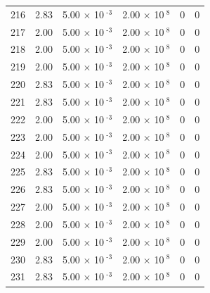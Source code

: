 \documentclass[a4paper,11pt]{article}
\begin{document}
\begin{center}
\begin{longtable}{|R{1.5cm}|R{2.4cm}|R{2.4cm}|R{2.4cm}|R{2.4cm}|R{2.4cm}|}
  216 &   2.83  &         5.00 $\times$ 10$^{\text{          -3}}$  &         2.00 $\times$ 10$^{\text{           8}}$  & 0  & 0 \\
  217 &   2.00  &         5.00 $\times$ 10$^{\text{          -3}}$  &         2.00 $\times$ 10$^{\text{           8}}$  & 0  & 0 \\
  218 &   2.00  &         5.00 $\times$ 10$^{\text{          -3}}$  &         2.00 $\times$ 10$^{\text{           8}}$  & 0  & 0 \\
  219 &   2.00  &         5.00 $\times$ 10$^{\text{          -3}}$  &         2.00 $\times$ 10$^{\text{           8}}$  & 0  & 0 \\
  220 &   2.83  &         5.00 $\times$ 10$^{\text{          -3}}$  &         2.00 $\times$ 10$^{\text{           8}}$  & 0  & 0 \\
  221 &   2.83  &         5.00 $\times$ 10$^{\text{          -3}}$  &         2.00 $\times$ 10$^{\text{           8}}$  & 0  & 0 \\
  222 &   2.00  &         5.00 $\times$ 10$^{\text{          -3}}$  &         2.00 $\times$ 10$^{\text{           8}}$  & 0  & 0 \\
  223 &   2.00  &         5.00 $\times$ 10$^{\text{          -3}}$  &         2.00 $\times$ 10$^{\text{           8}}$  & 0  & 0 \\
  224 &   2.00  &         5.00 $\times$ 10$^{\text{          -3}}$  &         2.00 $\times$ 10$^{\text{           8}}$  & 0  & 0 \\
  225 &   2.83  &         5.00 $\times$ 10$^{\text{          -3}}$  &         2.00 $\times$ 10$^{\text{           8}}$  & 0  & 0 \\
  226 &   2.83  &         5.00 $\times$ 10$^{\text{          -3}}$  &         2.00 $\times$ 10$^{\text{           8}}$  & 0  & 0 \\
  227 &   2.00  &         5.00 $\times$ 10$^{\text{          -3}}$  &         2.00 $\times$ 10$^{\text{           8}}$  & 0  & 0 \\
  228 &   2.00  &         5.00 $\times$ 10$^{\text{          -3}}$  &         2.00 $\times$ 10$^{\text{           8}}$  & 0  & 0 \\
  229 &   2.00  &         5.00 $\times$ 10$^{\text{          -3}}$  &         2.00 $\times$ 10$^{\text{           8}}$  & 0  & 0 \\
  230 &   2.83  &         5.00 $\times$ 10$^{\text{          -3}}$  &         2.00 $\times$ 10$^{\text{           8}}$  & 0  & 0 \\
  231 &   2.83  &         5.00 $\times$ 10$^{\text{          -3}}$  &         2.00 $\times$ 10$^{\text{           8}}$  & 0  & 0 \\

\end{longtable}
\end{center}
\end{document}

